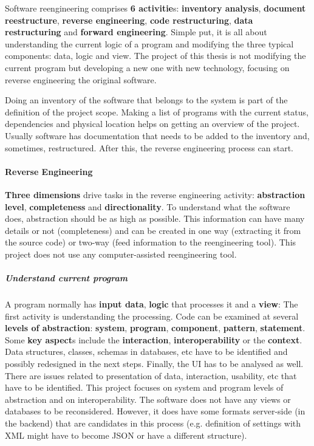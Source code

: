 Software reengineering comprises \textbf{6 activitie}s: \textbf{inventory analysis}, \textbf{document reestructure}, \textbf{reverse engineering}, \textbf{code restructuring}, \textbf{data restructuring} and \textbf{forward engineering}.
Simple put, it is all about understanding the current logic of a program and modifying the three typical components: data, logic and view.
The project of this thesis is not modifying the current program but developing a new one with new technology, focusing on reverse engineering the original software. 

Doing an inventory of the software that belongs to the system is part of the definition of the project scope.
Making a list of programs with the current status, dependencies and physical location helps on getting an overview of the project.
Usually software has documentation that needs to be added to the inventory and, sometimes, restructured.
After this, the reverse engineering process can start.

\paragraph{Reverse Engineering}
\textbf{Three dimensions} drive tasks in the reverse engineering activity: \textbf{abstraction level}, \textbf{completeness} and \textbf{directionality}.
To understand what the software does, abstraction should be as high as possible.
This information can have many details or not (completeness) and can be created in one way (extracting it from the source code) or two-way (feed information to the reengineering tool).
This project does not use any computer-assisted reengineering tool.

\subparagraph{Understand current program}
A program normally has \textbf{input data}, \textbf{logic} that processes it and a \textbf{view}:
The first activity is understanding the processing.
Code can be examined at several \textbf{levels of abstraction}: \textbf{system}, \textbf{program}, \textbf{component}, \textbf{pattern}, \textbf{statement}.
Some \textbf{key aspect}s include the \textbf{interaction}, \textbf{interoperability} or the \textbf{context}.
Data structures, classes, schemas in databases, etc have to be identified and possibly redesigned in the next steps.
Finally, the \ac{UI} has to be analysed as well. 
There are issues related to presentation of data, interaction, usability, etc that have to be identified.
This project focuses on system and program levels of abstraction and on interoperability.
The software does not have any views or databases to be reconsidered.
However, it does have some formats server-side (in the backend) that are candidates in this process (e.g. definition of settings with \ac{XML} might have to become \ac{JSON} or have a different structure).

